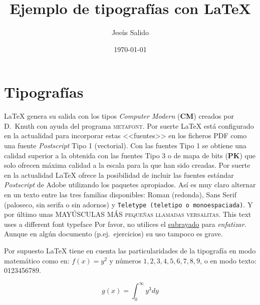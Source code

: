 \documentclass[11pt,a4paper]{article}
\title{Ejemplo de tipografías con \LaTeX}
\author{Jesús Salido}
\date{\today}
\begin{document}
\maketitle


\section{Tipografías}
\LaTeX{} genera su salida con los tipos \emph{Computer Modern} (\textbf{CM}) creados por D.~Knuth con ayuda del programa \textsc{metafont}. Por suerte \LaTeX{} está configurado en la actualidad para incorporar estas <<fuentes>> en los ficheros PDF como una fuente \emph{Postscript} Tipo 1 (vectorial). Con las fuentes Tipo 1 se obtiene una calidad superior a la obtenida con las fuentes Tipo 3 o de mapa de bits (\textbf{PK}) que solo ofrecen máxima calidad a la escala para la que han sido creadas. Por suerte en la actualidad \LaTeX{} ofrece la posibilidad de incluir las fuentes estándar \emph{Postscript} de \textsf{Adobe} utilizando los paquetes apropiados. Así es muy claro alternar en un texto entre las tres familias disponibles: Roman (redonda), \textsf{Sans Serif (paloseco, sin serifa o sin adornos)} y \texttt{Teletype (teletipo o monoespaciada)}. Y por último unas MAYÚSCULAS MÁS \textsc{pequeñas llamadas versalitas}. {\selectfont
This text uses a different font typeface
}
Por favor, no utilices el \underline{subrayado} para \emph{enfatizar}. Aunque en algún documento (p.ej.\ ejercicios) su uso tampoco es grave.

Por supuesto \LaTeX{} tiene en cuenta las particularidades de la tipografía en modo matemático como en: $f(x)=y^2$ y números $1,2,3,4,5,6,7,8,9$, o en modo texto: 0123456789.

$$g(x)=\int_{0}^{\infty}y^{3}dy$$
\end{document}
